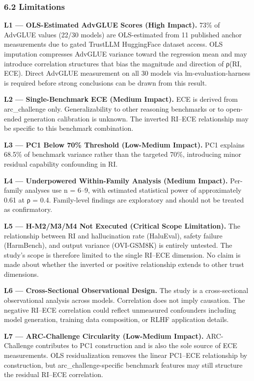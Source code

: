 \subsubsection{6.2 Limitations}

\textbf{L1 — OLS-Estimated AdvGLUE Scores (High Impact).} 73\% of AdvGLUE values (22/30 models) are OLS-estimated from 11 published anchor measurements due to gated TrustLLM HuggingFace dataset access. OLS imputation compresses AdvGLUE variance toward the regression mean and may introduce correlation structures that bias the magnitude and direction of ρ(RI, ECE). Direct AdvGLUE measurement on all 30 models via lm-evaluation-harness is required before strong conclusions can be drawn from this result.

\textbf{L2 — Single-Benchmark ECE (Medium Impact).} ECE is derived from arc_challenge only. Generalizability to other reasoning benchmarks or to open-ended generation calibration is unknown. The inverted RI–ECE relationship may be specific to this benchmark combination.

\textbf{L3 — PC1 Below 70\% Threshold (Low-Medium Impact).} PC1 explains 68.5\% of benchmark variance rather than the targeted 70\%, introducing minor residual capability confounding in RI.

\textbf{L4 — Underpowered Within-Family Analysis (Medium Impact).} Per-family analyses use n = 6–9, with estimated statistical power of approximately 0.61 at ρ = 0.4. Family-level findings are exploratory and should not be treated as confirmatory.

\textbf{L5 — H-M2/M3/M4 Not Executed (Critical Scope Limitation).} The relationship between RI and hallucination rate (HaluEval), safety failure (HarmBench), and output variance (OVI-GSM8K) is entirely untested. The study's scope is therefore limited to the single RI–ECE dimension. No claim is made about whether the inverted or positive relationship extends to other trust dimensions.

\textbf{L6 — Cross-Sectional Observational Design.} The study is a cross-sectional observational analysis across models. Correlation does not imply causation. The negative RI–ECE correlation could reflect unmeasured confounders including model generation, training data composition, or RLHF application details.

\textbf{L7 — ARC-Challenge Circularity (Low-Medium Impact).} ARC-Challenge contributes to PC1 construction and is also the sole source of ECE measurements. OLS residualization removes the linear PC1–ECE relationship by construction, but arc_challenge-specific benchmark features may still structure the residual RI–ECE correlation.


